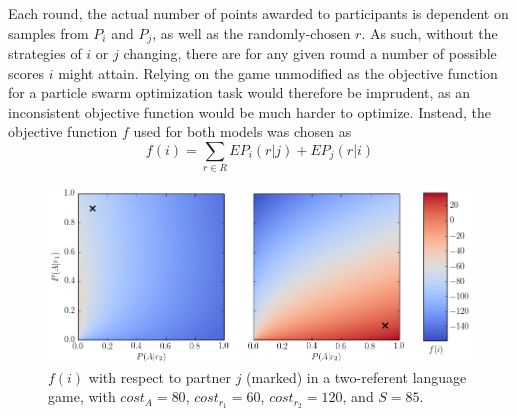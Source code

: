 \documentclass[12pt,a4paper]{article}
\begin{document}
Each round, the actual number of points awarded to participants is dependent on samples from $P_i$ and $P_j$, as well as the randomly-chosen $r$. As such, without the strategies of $i$ or $j$ changing, there are for any given round a number of possible scores $i$ might attain. Relying on the game unmodified as the objective function for a particle swarm optimization task would therefore be imprudent, as an inconsistent objective function would be much harder to optimize. Instead, the objective function $f$ used for both models was chosen as 
\[
f(i) = \sum_{r \in R} EP_{i}(r|j) + EP_{j}(r|i)
\]

\begin{figure}
\centering
\includegraphics[width=\textwidth]{objective_function_cropped.png}
\caption{$f(i)$ with respect to partner $j$ (marked) in a two-referent language game, with $cost_A=80$, $cost_{r_1}=60$, $cost_{r_2}=120$, and $S=85$.}
\label{fig:1}
\end{figure}
\end{document}
